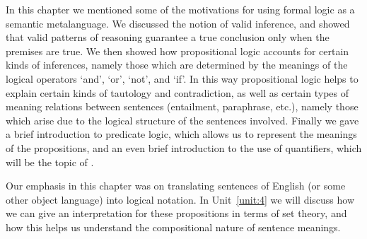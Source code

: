 In this chapter we mentioned some of the motivations for using formal logic as a semantic metalanguage. We discussed the notion of valid inference, and showed that valid patterns of reasoning guarantee a true conclusion only when the premises are true. We then showed how propositional logic accounts for certain kinds of inferences, namely those which are determined by the meanings of the logical operators ‘and’, ‘or’, ‘not’, and ‘if’. In this way propositional logic helps to explain certain kinds of tautology and contradiction, as well as certain types of meaning relations between sentences (entailment, paraphrase, etc.), namely those which arise due to the logical structure of the sentences involved. Finally we gave a brief introduction to predicate logic, which allows us to represent the meanings of the propositions, and an even brief introduction to the use of quantifiers, which will be the topic of .



Our emphasis in this chapter was on translating sentences of English (or some other object language) into logical notation. In Unit~\ref{unit:4} we will discuss how we can give an interpretation for these propositions in terms of set theory, and how this helps us understand the compositional nature of sentence meanings.




